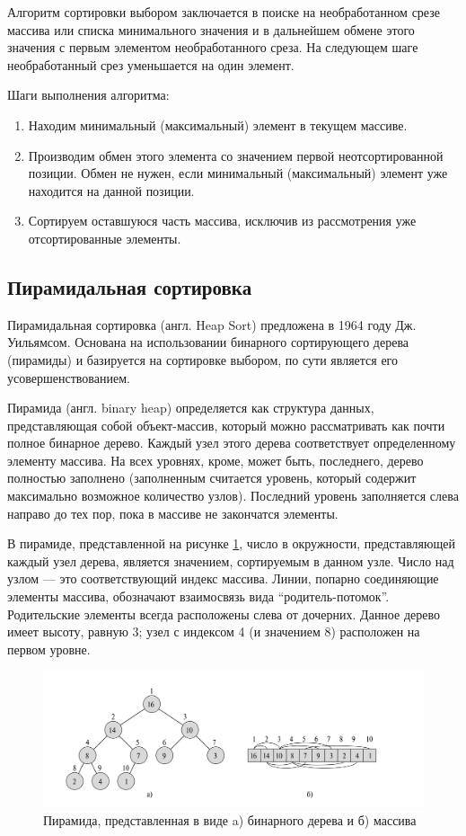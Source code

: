 Алгоритм сортировки выбором заключается в поиске на необработанном срезе массива или списка минимального значения и в дальнейшем обмене этого значения с первым элементом необработанного среза. На следующем шаге необработанный срез уменьшается на один элемент.

Шаги выполнения алгоритма:
\begin{enumerate} 
	\item Находим  минимальный (максимальный)  элемент  в  текущем  массиве. 
	\item Производим обмен этого элемента со значением первой неотсортированной позиции.  Обмен  не  нужен,  если минимальный (максимальный) элемент уже находится на данной позиции. 
	\item Сортируем оставшуюся часть массива, исключив из рассмотрения уже отсортированные элементы. 
\end{enumerate}

\subsection{Пирамидальная сортировка}

Пирамидальная сортировка \cite{book_lipachev, book_sort_algorithms, book_knut, book_kormen}  (англ. Heap Sort) предложена в 1964 году Дж. Уильямсом. Основана на использовании бинарного сортирующего дерева (пирамиды) и базируется на сортировке выбором, по сути является его усовершенствованием.

Пирамида (англ. binary heap) определяется как структура данных, представляющая собой объект-массив, который можно рассматривать как почти полное бинарное дерево. Каждый узел этого дерева соответствует определенному элементу массива. На всех уровнях, кроме, может быть, последнего, дерево полностью заполнено (заполненным считается уровень, который содержит максимально возможное количество узлов). Последний уровень заполняется слева направо до тех пор, пока в массиве не закончатся элементы. 

В пирамиде, представленной на рисунке \ref{fig:heap_structs}, число в окружности, представляющей каждый узел дерева, является значением, сортируемым в данном узле. Число над узлом — это соответствующий индекс массива. Линии, попарно соединяющие элементы массива, обозначают взаимосвязь вида “родитель-потомок”. Родительские элементы всегда расположены слева от дочерних. Данное дерево имеет высоту, равную 3; узел с индексом 4 (и значением 8) расположен на первом уровне.

\begin{figure}[h]
	\centering
	\includegraphics[height=0.25\textheight]{img/heap_structs.png}
	\caption{Пирамида, представленная в виде a) бинарного дерева и б) массива}
	\label{fig:heap_structs}
\end{figure}

